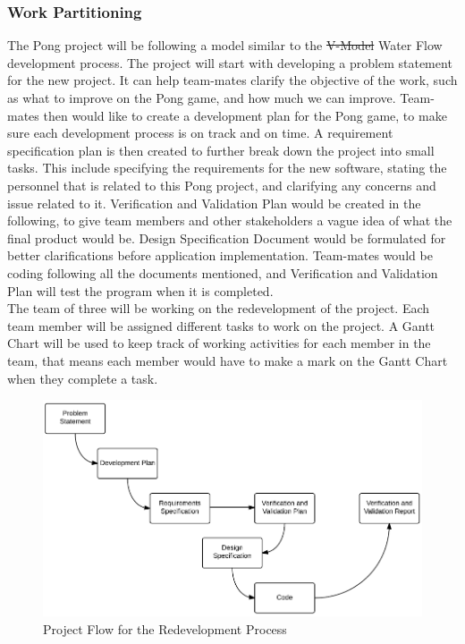 \documentclass[12pt,letterpaper]{article}
\begin{document}
	\subsubsection{Work Partitioning}
	The Pong project will be following a model similar to the \st{V-Model} Water Flow development process. The project will start with developing a problem statement for the new project. It can help team-mates clarify the objective of the work, such as what to improve on the Pong game, and how much we can improve. Team-mates then would like to create a development plan for the Pong game, to make sure each development process is on track and on time. A requirement specification plan is then created to further break down the project into small tasks. This include specifying the requirements for the new software, stating the personnel that is related to this Pong project, and clarifying any concerns and issue related to it. Verification and Validation Plan would be created in the following, to give team members and other stakeholders a vague idea of what the final product would be. Design Specification Document would be formulated for better clarifications before application implementation. Team-mates would be coding following all the documents mentioned, and Verification and Validation Plan will test the program when it is completed.\\
\noindent The team of three will be working on the redevelopment of the project. Each team member will be assigned different tasks to work on the project. A Gantt Chart will be used to keep track of working activities for each member in the team, that means each member would have to make a mark on the Gantt Chart when they complete a task. \\
\begin{figure}[h]
  \includegraphics[scale=0.6]{ProjectFlow.png}
  \caption{Project Flow for the Redevelopment Process}
\end{figure}
\end{document}
